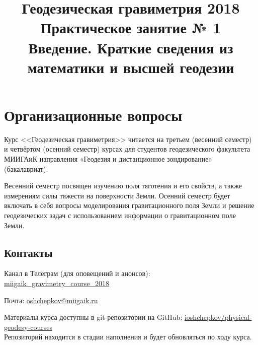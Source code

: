 \documentclass[11pt, a4paper]{article}
\title{{\Large Геодезическая гравиметрия 2018}\\ 
    {\bf\Large Практическое занятие № 1} \\
{\Large Введение. Краткие сведения из математики и высшей геодезии}}
\author{}
\date{\DTMusedate{lessondate}}
\theoremstyle{plain}
\theoremstyle{definition}
\theoremstyle{remark}
\begin{document}
\maketitle

\section{Организационные вопросы}

Курс <<Геодезическая гравиметрия>> читается на третьем (весенний семестр) и четвёртом
(осенний семестр) курсах для студентов геодезического факультета МИИГАиК направления «Геодезия и
дистанционное зондирование» (бакалавриат).

Весенний семестр посвящен изучению поля тяготения и его свойств, а также измерениям силы тяжести на
поверхности Земли. 
Осенний семестр будет включать в себя вопросы моделирования гравитационного поля Земли и решение
геодезических задач с использованием информации о гравитационном поле Земли.

\subsection{Контакты}

Канал в Телеграм (для оповещений и анонсов):
\href{https://t.me/miigaik_gravimetry_course_2018}{miigaik\_gravimetry\_course\_2018}

Почта: \href{mailto:oshchepkov@miigaik.ru}{oshchepkov@miigaik.ru}

Материалы курса доступны в git-репозитории на GitHub:
\href{https://github.com/ioshchepkov/physical-geodesy-courses}{ioshchepkov/physical-geodesy-courses}\\

Репозиторий находится в стадии наполнения и будет обновляться по ходу курса.
\end{document}
